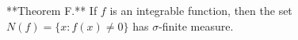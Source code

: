 **Theorem F.** If $f$ is an integrable function, then the set $N(f) = \{x : f(x) \neq 0\}$ has $\sigma$-finite measure.
